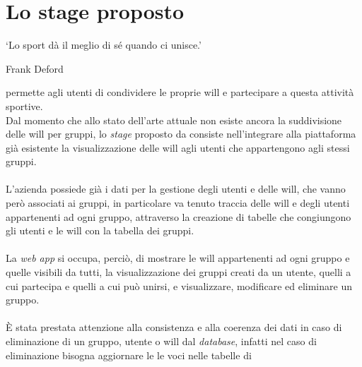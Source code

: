 \section{Lo stage proposto}
\epigraph{\label{eph: sport}\enquote*{Lo sport dà il meglio di sé quando ci
            unisce.}}{Frank Deford}
\noindent \productName permette agli utenti di condividere le proprie
\gls{will} e partecipare a questa attività sportive.\\
Dal momento che allo stato dell'arte attuale non esiste ancora la suddivisione
delle \gls{will}
per gruppi, lo \textit{stage} proposto da \myCompany consiste nell'integrare
alla piattaforma già esistente
la visualizzazione delle \gls{will} agli utenti che appartengono agli stessi
gruppi.\\ \\
L'azienda possiede già i dati per la gestione degli utenti e delle
\gls{will}, che vanno però associati ai gruppi, in particolare va tenuto
traccia delle \gls{will} e degli utenti appartenenti ad ogni gruppo, attraverso
la creazione di tabelle che congiungono gli
utenti e le \gls{will} con la tabella dei gruppi.\\ \\
La \textit{web app} si occupa, perciò, di mostrare le \gls{will} appartenenti
ad ogni gruppo e quelle visibili da tutti, la visualizzazione dei gruppi creati
da un utente, quelli a cui partecipa e quelli a cui può unirsi, e visualizzare,
modificare ed eliminare un gruppo. \\ \\
È stata prestata attenzione alla consistenza e alla coerenza dei dati in
caso di eliminazione di un gruppo, utente o \gls{will} dal \textit{database},
infatti nel caso di eliminazione bisogna aggiornare le le voci nelle tabelle di

